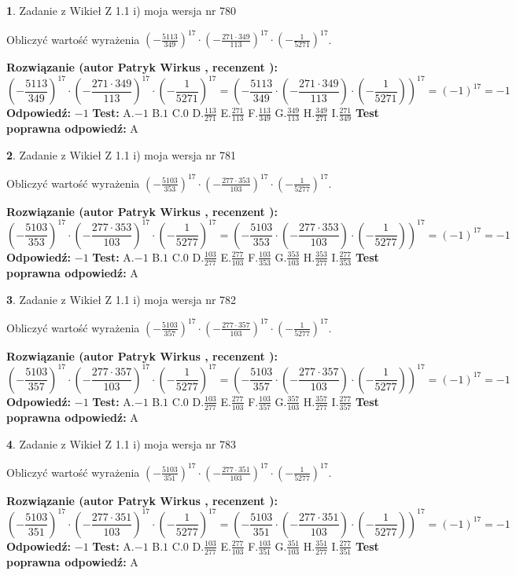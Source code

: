 \documentclass[12pt, a4paper]{article}
\theoremstyle{definition} %
\newtheorem{zad}{}
\newcommand{\zadStart}[1]{\begin{zad}#1\newline}
\newcommand{\zadStop}{\end{zad}}
\newcommand{\rozwStart}[2]{\noindent \textbf{Rozwiązanie (autor #1 , recenzent #2): }\newline}
\newcommand{\rozwStop}{\newline}
\newcommand{\odpStart}{\noindent \textbf{Odpowiedź:}\newline}
\newcommand{\odpStop}{\newline}
\newcommand{\testStart}{\noindent \textbf{Test:}\newline}
\newcommand{\testStop}{\newline}
\newcommand{\kluczStart}{\noindent \textbf{Test poprawna odpowiedź:}\newline}
\newcommand{\kluczStop}{\newline}
\begin{document}
\zadStart{Zadanie z Wikieł Z 1.1 i) moja wersja nr 780}

Obliczyć wartość wyrażenia $(-\frac{5113}{349})^{17} \cdot (-\frac{271 \cdot 349}{113})^{17} \cdot (-\frac{1}{5271})^{17}$.
\zadStop
\rozwStart{Patryk Wirkus}{}
$$(-\frac{5113}{349})^{17} \cdot (-\frac{271 \cdot 349}{113})^{17} \cdot (-\frac{1}{5271})^{17} = (-\frac{5113}{349} \cdot (-\frac{271 \cdot 349}{113}) \cdot (-\frac{1}{5271}))^{17} = (-1)^{17} = -1$$
\rozwStop
\odpStart
$-1$
\odpStop
\testStart
A.$-1$ B.$1$ C.$0$ D.$\frac{113}{271}$ E.$\frac{271}{113}$
F.$\frac{113}{349}$ G.$\frac{349}{113}$
H.$\frac{349}{271}$
I.$\frac{271}{349}$
\testStop
\kluczStart
A
\kluczStop



\zadStart{Zadanie z Wikieł Z 1.1 i) moja wersja nr 781}

Obliczyć wartość wyrażenia $(-\frac{5103}{353})^{17} \cdot (-\frac{277 \cdot 353}{103})^{17} \cdot (-\frac{1}{5277})^{17}$.
\zadStop
\rozwStart{Patryk Wirkus}{}
$$(-\frac{5103}{353})^{17} \cdot (-\frac{277 \cdot 353}{103})^{17} \cdot (-\frac{1}{5277})^{17} = (-\frac{5103}{353} \cdot (-\frac{277 \cdot 353}{103}) \cdot (-\frac{1}{5277}))^{17} = (-1)^{17} = -1$$
\rozwStop
\odpStart
$-1$
\odpStop
\testStart
A.$-1$ B.$1$ C.$0$ D.$\frac{103}{277}$ E.$\frac{277}{103}$
F.$\frac{103}{353}$ G.$\frac{353}{103}$
H.$\frac{353}{277}$
I.$\frac{277}{353}$
\testStop
\kluczStart
A
\kluczStop



\zadStart{Zadanie z Wikieł Z 1.1 i) moja wersja nr 782}

Obliczyć wartość wyrażenia $(-\frac{5103}{357})^{17} \cdot (-\frac{277 \cdot 357}{103})^{17} \cdot (-\frac{1}{5277})^{17}$.
\zadStop
\rozwStart{Patryk Wirkus}{}
$$(-\frac{5103}{357})^{17} \cdot (-\frac{277 \cdot 357}{103})^{17} \cdot (-\frac{1}{5277})^{17} = (-\frac{5103}{357} \cdot (-\frac{277 \cdot 357}{103}) \cdot (-\frac{1}{5277}))^{17} = (-1)^{17} = -1$$
\rozwStop
\odpStart
$-1$
\odpStop
\testStart
A.$-1$ B.$1$ C.$0$ D.$\frac{103}{277}$ E.$\frac{277}{103}$
F.$\frac{103}{357}$ G.$\frac{357}{103}$
H.$\frac{357}{277}$
I.$\frac{277}{357}$
\testStop
\kluczStart
A
\kluczStop



\zadStart{Zadanie z Wikieł Z 1.1 i) moja wersja nr 783}

Obliczyć wartość wyrażenia $(-\frac{5103}{351})^{17} \cdot (-\frac{277 \cdot 351}{103})^{17} \cdot (-\frac{1}{5277})^{17}$.
\zadStop
\rozwStart{Patryk Wirkus}{}
$$(-\frac{5103}{351})^{17} \cdot (-\frac{277 \cdot 351}{103})^{17} \cdot (-\frac{1}{5277})^{17} = (-\frac{5103}{351} \cdot (-\frac{277 \cdot 351}{103}) \cdot (-\frac{1}{5277}))^{17} = (-1)^{17} = -1$$
\rozwStop
\odpStart
$-1$
\odpStop
\testStart
A.$-1$ B.$1$ C.$0$ D.$\frac{103}{277}$ E.$\frac{277}{103}$
F.$\frac{103}{351}$ G.$\frac{351}{103}$
H.$\frac{351}{277}$
I.$\frac{277}{351}$
\testStop
\kluczStart
A
\kluczStop
\end{document}
